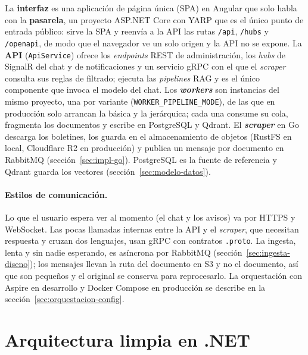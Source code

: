 La \textbf{interfaz} es una aplicación de página única (SPA) en Angular que solo habla con la \textbf{pasarela}, un proyecto ASP.NET Core con YARP \cite{yarp} que es el único punto de entrada público: sirve la SPA y reenvía a la API las rutas \texttt{/api}, \texttt{/hubs} y \texttt{/openapi}, de modo que el navegador ve un solo origen y la API no se expone. La \textbf{API} (\texttt{ApiService}) ofrece los \emph{endpoints} REST de administración, los \emph{hubs} de SignalR del chat y de notificaciones y un servicio gRPC con el que el \emph{scraper} consulta sus reglas de filtrado; ejecuta las \emph{pipelines} RAG y es el único componente que invoca el modelo del chat. Los \textbf{\emph{workers}} son instancias del mismo proyecto, una por variante (\texttt{WORKER\_PIPELINE\_MODE}), de las que en producción solo arrancan la básica y la jerárquica; cada una consume su cola, fragmenta los documentos y escribe en PostgreSQL y Qdrant. El \textbf{\emph{scraper}} en Go descarga los boletines, los guarda en el almacenamiento de objetos (RustFS en local, Cloudflare R2 en producción) y publica un mensaje por documento en RabbitMQ (sección~\ref{sec:impl-go}). PostgreSQL es la fuente de referencia y Qdrant guarda los vectores (sección~\ref{sec:modelo-datos}).

\paragraph{Estilos de comunicación.} Lo que el usuario espera ver al momento (el chat y los avisos) va por HTTPS y WebSocket. Las pocas llamadas internas entre la API y el \emph{scraper}, que necesitan respuesta y cruzan dos lenguajes, usan gRPC con contratos \texttt{.proto}. La ingesta, lenta y sin nadie esperando, es asíncrona por RabbitMQ (sección~\ref{sec:ingesta-diseno}); los mensajes llevan la ruta del documento en S3 y no el documento, así que son pequeños y el original se conserva para reprocesarlo. La orquestación con Aspire en desarrollo y Docker Compose en producción se describe en la sección~\ref{sec:orquestacion-config}.

\section{Arquitectura limpia en .NET}
\label{sec:clean}

